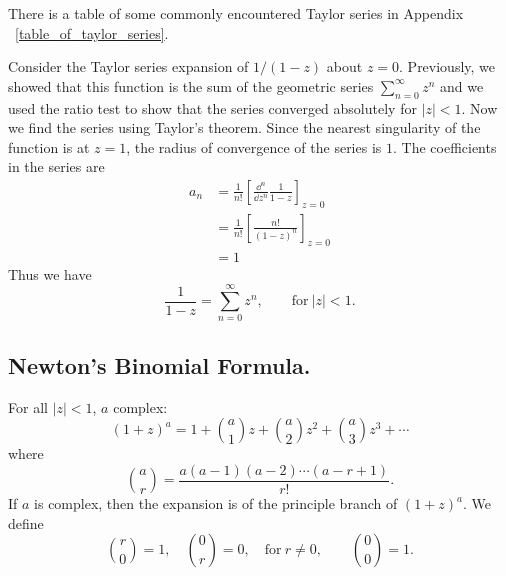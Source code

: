 There is a table of some commonly encountered Taylor series in Appendix
~\ref{table_of_taylor_series}.





\begin{Example}
  Consider the Taylor series expansion of $1/(1 - z)$ about $z = 0$.
  Previously, we showed that this function is the sum of the geometric series
  $\sum_{n = 0}^\infty z^n$ and we used the ratio test to show that the series 
  converged absolutely for $|z| < 1$.  Now we find the series using
  Taylor's theorem.  Since the nearest singularity of the function is at 
  $z = 1$, the radius of convergence of the series is $1$.
  The coefficients in the series are
  \begin{align*}
    a_n     
    &= \frac{1}{n!} \left[ \frac{\dd^n}{\dd z^n} \frac{1}{1 - z} \right]_{z=0} 
    \\
    &= \frac{1}{n!} \left[ \frac{n!}{(1 - z)^n} \right]_{z=0} 
    \\
    &= 1
  \end{align*}
  Thus we have
  \[
  \frac{1}{1-z} = \sum_{n = 0}^\infty z^n , \qquad \mathrm{for}\ |z| < 1.
  \]
\end{Example}











\subsection{Newton's Binomial Formula.}




\begin{Result}
  For all $|z| < 1$, $a$ complex:
  \[ 
  (1 + z)^a = 1 + \binom{a}{1} z + \binom{a}{2} z^2 + \binom{a}{3} z^3 + \cdots 
  \]
  where
  \[ 
  \binom{a}{r} = \frac{a (a-1) (a-2)\cdots(a-r+1)}{r!}. 
  \]
  If $a$ is complex, then the expansion is of the principle branch of
  $(1 + z)^a$.  We define
  \[
  \binom{r}{0} = 1, \quad \binom{0}{r} = 0, \quad \mathrm{for}\ r \neq 0,
  \qquad \binom{0}{0} = 1.
  \]
\end{Result}







